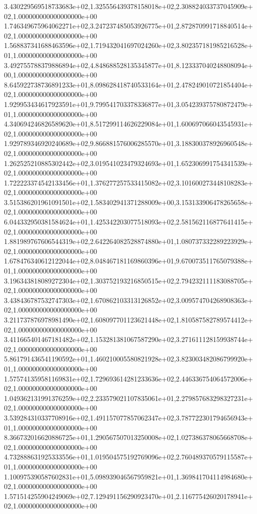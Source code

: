3.430229569518733683e+02,1.325556439378158018e+02,2.308824033737045909e+02,1.000000000000000000e+00
1.746349675964062271e+02,3.247237485053926775e+01,2.872870991718840514e+02,1.000000000000000000e+00
1.568837341688463596e+02,1.719432041697024260e+02,3.802357181985216528e+01,1.000000000000000000e+00
3.492755788379886894e+02,4.848688528135345877e+01,8.123337040248808094e+00,1.000000000000000000e+00
8.645922738736891233e+01,8.098628418740533164e+01,2.478249010721854404e+02,1.000000000000000000e+00
1.929953434617923591e+01,9.799541703378336877e+01,3.054239375780872479e+01,1.000000000000000000e+00
4.340694246826589620e+01,8.517299114626229084e+01,1.600697066043545931e+02,1.000000000000000000e+00
1.929789346920240689e+02,9.866881576006285570e+01,3.188300378926960548e+02,1.000000000000000000e+00
1.262525210885302442e+02,3.019541023479324693e+01,1.652306991754341539e+02,1.000000000000000000e+00
1.722223374542133456e+01,1.376277257533415082e+02,3.101600273448108283e+02,1.000000000000000000e+00
3.515386201961091501e+02,1.583402941371288009e+00,3.153133906478265658e+02,1.000000000000000000e+00
6.044332950381584624e+01,1.425342203077518093e+02,2.581562116877641415e+02,1.000000000000000000e+00
1.881989767606544319e+02,2.642264082528874880e+01,1.080737332289223929e+02,1.000000000000000000e+00
1.678476340612122044e+02,8.048467181169860396e+01,9.670073511765079388e+01,1.000000000000000000e+00
3.196343818089272304e+02,1.303752193216850515e+02,2.794232111183088705e+02,1.000000000000000000e+00
3.438436787532747303e+02,1.670862103313126852e+02,3.009574704268908363e+02,1.000000000000000000e+00
3.211737876978981490e+02,1.608097701123621448e+02,1.810587582789574412e+02,1.000000000000000000e+00
3.411665401467181482e+02,1.153281381067587290e+02,3.271611128159938744e+02,1.000000000000000000e+00
5.861791436541190592e+01,1.460210005580821928e+02,3.823003482086799920e+01,1.000000000000000000e+00
1.575741359581169831e+02,1.729693614281233636e+02,2.446336754064572006e+02,1.000000000000000000e+00
1.049362131991376259e+02,2.233579021107835061e+01,2.279857683298327231e+02,1.000000000000000000e+00
3.539284310337708916e+02,1.491157077857062347e+02,3.787722301794656943e+01,1.000000000000000000e+00
8.366732016620886725e+01,1.290567507013250008e+02,1.027386378065668708e+02,1.000000000000000000e+00
4.732888631925333556e+01,1.019504575192769096e+02,2.760489370579115587e+01,1.000000000000000000e+00
1.100975390587602831e+01,5.098939046567959821e+01,1.369841704114984680e+02,1.000000000000000000e+00
1.571514255904249069e+02,7.129491156290923470e+01,2.116775426020178941e+02,1.000000000000000000e+00

